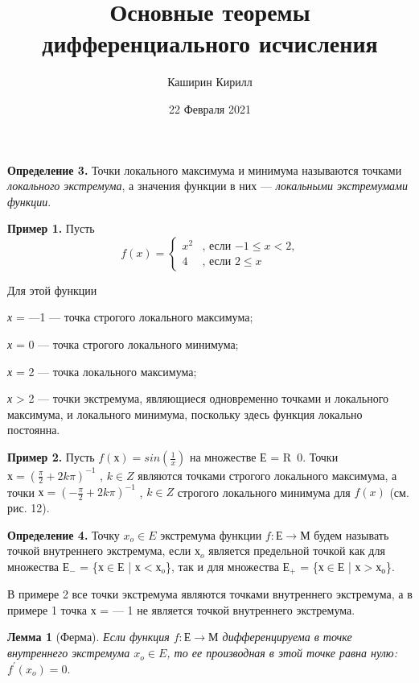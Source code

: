 \documentclass{article}
\title{Основные теоремы дифференциального исчисления}
\author{Каширин Кирилл}
\date{22 Февраля 2021}
\begin{document}
	\maketitle
	\textbf {Определение 3.} Точки локального максимума и минимума называются точками \textit {локального экстремума}, а значения функции в них — \textit {локальными экстремумами функции}.
	\medskip \par \textbf {Пример 1.} Пусть
	\begin{equation}
		f(x) = 
		\begin{cases}
			x^2 &\text{, если  $-1\le x < 2$,}\\
			4 &\text{, если $2\le x$}
		\end{cases}
	\end{equation}
	\begin{center}
	\end{center}
	\par	Для этой функции
	\par \textit {х} = —1 — точка строгого локального максимума;
	\par \textit {х} = 0 — точка строгого локального минимума;
	\par \textit {х} = 2 — точка локального максимума;
	\par \textit {х} > 2 — точки экстремума, являющиеся одновременно точками и локального максимума, и локального минимума, поскольку здесь функция локально постоянна.
	\medskip \par \textbf {Пример 2.} Пусть $f(х) = sin(\frac 1x)$ на множестве Е = R\ 0.
	Точки $х = (\frac \pi 2 + 2k\pi)^{-1}$ , $k \in Z$  являются точками строгого локального максимума, а точки $х = (-\frac \pi 2 + 2k\pi)^{-1}$ , $k \in Z$
	строгого локального минимума для $f(x)$ (см. рис. 12).
	\medskip	\par \textbf {Определение 4.} Точку $x_o \in E$ экстремума функции $f: Е \rightarrow М$  будем называть точкой внутреннего экстремума, если $х_o$ является предельной точкой как для множества 
	$Е_-$ = \{$х \in Е$ | $х < х_o$\}, так и для множества $Е_+$ = \{$х \in Е$ | $ х > х_о$\}.
	\medskip	\par В примере 2 все точки экстремума являются точками внутреннего экстремума, а в примере 1 точка х = — 1 не является точкой внутреннего экстремума.
	\medskip	\par \textbf {Лемма 1} (Ферма). \textit {Если функция $f: Е \rightarrow М$ дифференцируема в точке внутреннего экстремума $x_o \in E$, то ее производная в этой точке равна нулю:}
	$f^\prime(x_o)=0$.
\end{document}
